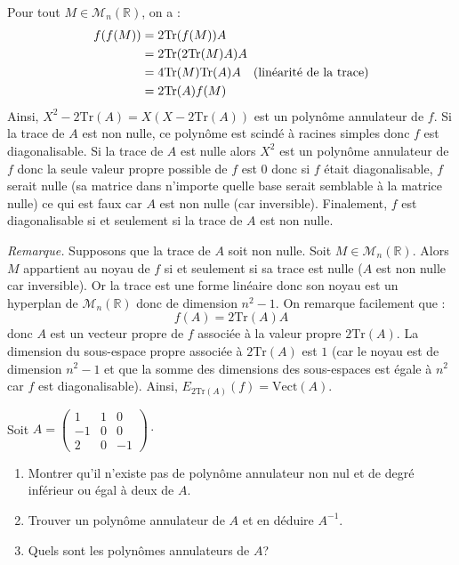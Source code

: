 \documentclass[a4paper,10pt]{report}
\begin{document}
\medskip
%

\noindent Pour tout $M \in \mathcal{M}_n(\mathbb{R})$, on a :
\begin{align*}
f(f(M)) & =  2\textrm{Tr}(f(M)) A \\
& = 2\textrm{Tr}(2\textrm{Tr}(M) A) A \\
& = 4 \textrm{Tr}(M) \textrm{Tr}(A) A \quad \hbox{(linéarité de la trace)} \\
& = 2 \textrm{Tr}(A) f(M)
\end{align*}
Ainsi, $X^2-2\textrm{Tr}(A)= X(X- 2 \textrm{Tr}(A))$ est un polynôme annulateur de $f$. Si la trace de $A$ est non nulle, ce polynôme est scindé à racines simples donc $f$ est diagonalisable. Si la trace de $A$ est nulle alors $X^2$ est un polynôme annulateur de $f$ donc la seule valeur propre possible de $f$ est $0$ donc si $f$ était diagonalisable, $f$ serait nulle (sa matrice dans n'importe quelle base serait semblable à la matrice nulle) ce qui est faux car $A$ est non nulle (car inversible). Finalement, $f$ est diagonalisable si et seulement si la trace de $A$ est non nulle.

\medskip

\noindent \textit{Remarque.} Supposons que la trace de $A$ soit non nulle. Soit $M \in \mathcal{M}_n(\mathbb{R})$. Alors $M$ appartient au noyau de $f$ si et seulement si sa trace est nulle ($A$ est non nulle car inversible). Or la trace est une forme linéaire donc son noyau est un hyperplan de $\mathcal{M}_n(\mathbb{R})$ donc de dimension $n^2-1$. On remarque facilement que :
$$ f(A) = 2 \textrm{Tr}(A) A$$
donc $A$ est un vecteur propre de $f$ associée à la valeur propre $2 \textrm{Tr}(A)$. La dimension du sous-espace propre associée à $2 \textrm{Tr}(A)$ est $1$ (car le noyau est de dimension $n^2-1$ et que la somme des dimensions des sous-espaces est égale à $n^2$ car $f$ est diagonalisable). Ainsi, $E_{2\textrm{Tr}(A)}(f) = \textrm{Vect}(A)$.




\begin{Exercice}{} Soit $A = \begin{pmatrix}
1 & 1 & 0 \\
-1 & 0 & 0 \\
2 & 0 & -1 
\end{pmatrix}\cdot$
\begin{enumerate}
\item Montrer qu'il n'existe pas de polynôme annulateur non nul et de degré inférieur ou égal à deux de $A$.
\item Trouver un polynôme annulateur de $A$ et en déduire $A^{-1}$.
\item Quels sont les polynômes annulateurs de $A$?
\end{enumerate}
\end{Exercice}
\end{document}
